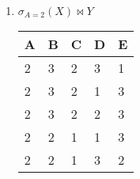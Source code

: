 \documentclass{lehramt-informatik-aufgabe}
\begin{document}
\begin{enumerate}
\item $\sigma_{A=2}(X) \bowtie Y$

\begin{liAntwort}
\begin{tabular}{|l|l|l|l|l|}
\hline
A & B & C & D & E \\ \hline
2 & 3 & 2 & 3 & 1 \\ \hline
2 & 3 & 2 & 1 & 3 \\ \hline
2 & 3 & 2 & 2 & 3 \\ \hline
2 & 2 & 1 & 1 & 3 \\ \hline
2 & 2 & 1 & 3 & 2 \\ \hline
\end{tabular}

\end{liAntwort}


\end{enumerate}
\end{document}
